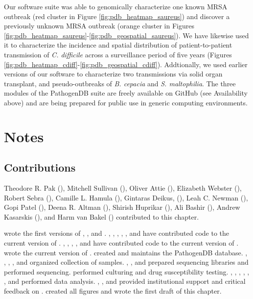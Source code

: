 Our software suite was able to genomically characterize one known MRSA outbreak (red cluster in Figure \ref{fig:pdb_heatmap_saureus}) and discover a previously unknown MRSA outbreak (orange cluster in Figures \ref{fig:pdb_heatmap_saureus}-\ref{fig:pdb_geospatial_saureus}). We have likewise used it to characterize the incidence and spatial distribution of patient-to-patient transmission of \emph{C. difficile} across a surveillance period of five years (Figures \ref{fig:pdb_heatmap_cdiff}-\ref{fig:pdb_geospatial_cdiff}). Addtionally, we used earlier versions of our software to characterize two transmissions via solid organ transplant,\autocite{Altman2014,Bashir2017} and pseudo-outbreaks of \emph{B. cepacia} and \emph{S. maltophilia}.\autocite{Pak2015a} The three modules of the PathogenDB suite are freely available on GitHub (see Availability above) and are being prepared for public use in generic computing environments.

\section*{Notes}

\subsection*{Contributions}

Theodore R. Pak (), Mitchell Sullivan (), Oliver Attie (), Elizabeth Webster (), Robert Sebra (), Camille L. Hamula (), Gintaras Deikus, (), Leah C. Newman (), Gopi Patel (), Deena R. Altman (), Shirish Huprikar (), Ali Bashir (), Andrew Kasarskis (), and Harm van Bakel () contributed to this chapter. 

 wrote the first versions of \pathogendbpipeline, \pathogendbcomparison, and \pathogendbviz. , , , , , and  have contributed code to the current version of \pathogendbpipeline. , , , , and  have contributed code to the current version of \pathogendbcomparison.  wrote the current version of \pathogendbviz.  created and maintains the PathogenDB database. , , , , and  organized collection of samples. , , and  prepared sequencing libraries and performed sequencing.  performed culturing and drug susceptibility testing. , , , , , , and  performed data analysis. , , and  provided institutional support and critical feedback on \pathogendbviz.  created all figures and wrote the first draft of this chapter.

